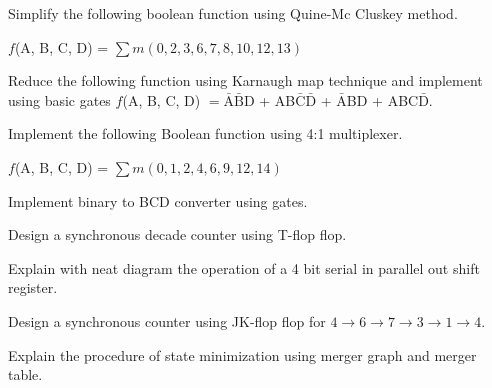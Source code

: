 \markB
\partCo

\item \iitem Simplify the following boolean function using Quine-Mc Cluskey method.

  $f$(A, B, C, D) = $\sum m(0, 2, 3, 6, 7, 8, 10, 12, 13)$

\newpage \again

\Or
\item Reduce the following function using Karnaugh map technique and implement using
  basic gates $f$(A, B, C, D) $= \bar{\text{A}}\bar{\text{B}}$D + AB$\bar{\text{C}}\bar{\text{D}}$
  + $\bar{\text{A}}$BD + ABC$\bar{\text{D}}$.
\ene

\item \iitem Implement the following Boolean function using 4:1 multiplexer.

  $f$(A, B, C, D) = $\sum m(0, 1, 2, 4, 6, 9, 12, 14)$
\Or
\item Implement binary to BCD converter using gates.
\ene

\item \iitem Design a synchronous decade counter using T-flop flop.
\Or
\item Explain with neat diagram the operation of a 4 bit serial in parallel out
  shift register.
\ene

\item \iitem Design a synchronous counter using JK-flop flop for $4 \to 6 \to 7 \to 3 \to 1 \to 4$.
\Or
\item Explain the procedure of state minimization using merger graph and merger table.
\ene

\markC
\ene
